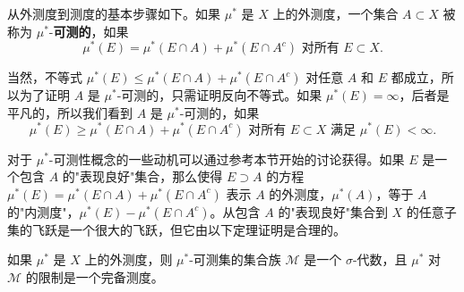 \documentclass[lang=cn,10pt,thmcnt=section]{elegantbook}
\begin{document}
从外测度到测度的基本步骤如下。如果 $\mu^*$ 是 $X$ 上的外测度，一个集合 $A \subset X$ 被称为 $\mu^*$-\textbf{可测的}，如果
\[\mu^*(E) = \mu^*(E \cap A) + \mu^*(E \cap A^c) \text{ 对所有 } E \subset X.\]

当然，不等式 $\mu^*(E) \leq \mu^*(E \cap A) + \mu^*(E \cap A^c)$ 对任意 $A$ 和 $E$ 都成立，所以为了证明 $A$ 是 $\mu^*$-可测的，只需证明反向不等式。如果 $\mu^*(E) = \infty$，后者是平凡的，所以我们看到 $A$ 是 $\mu^*$-可测的，如果
\[\mu^*(E) \geq \mu^*(E \cap A) + \mu^*(E \cap A^c) \text{ 对所有 } E \subset X \text{ 满足 } \mu^*(E) < \infty.\]

对于 $\mu^*$-可测性概念的一些动机可以通过参考本节开始的讨论获得。如果 $E$ 是一个包含 $A$ 的"表现良好"集合，那么使得 $E \supset A$ 的方程 $\mu^*(E) = \mu^*(E \cap A) + \mu^*(E \cap A^c)$ 表示 $A$ 的外测度，$\mu^*(A)$，等于 $A$ 的"内测度"，$\mu^*(E) - \mu^*(E \cap A^c)$。从包含 $A$ 的"表现良好"集合到 $X$ 的任意子集的飞跃是一个很大的飞跃，但它由以下定理证明是合理的。

\begin{theorem}\label{theorem1.11}
如果 $\mu^*$ 是 $X$ 上的外测度，则 $\mu^*$-可测集的集合族 $\mathcal{M}$ 是一个 $\sigma$-代数，且 $\mu^*$ 对 $\mathcal{M}$ 的限制是一个完备测度。
\end{theorem}
\end{document}
